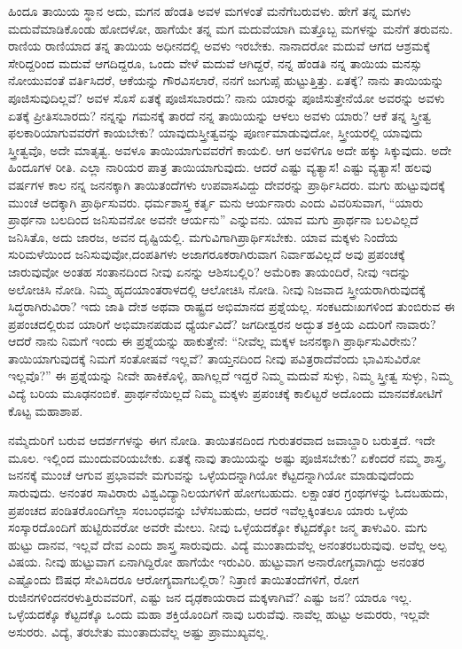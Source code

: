 ಹಿಂದೂ ತಾಯಿಯ ಸ್ಥಾನ ಅದು, ಮಗನ ಹೆಂಡತಿ ಅವಳ ಮಗಳಂತೆ ಮನೆಗೆ\break ಬರುವಳು. ಹೇಗೆ ತನ್ನ ಮಗಳು ಮದುವೆಮಾಡಿಕೊಂಡು ಹೋದಳೋ, ಹಾಗೆಯೇ ತನ್ನ ಮಗ ಮದುವೆಯಾಗಿ ಮತ್ತೊಬ್ಬ ಮಗಳನ್ನು ಮನೆಗೆ ತರುವನು. ರಾಣಿಯ ರಾಣಿಯಾದ ತನ್ನ ತಾಯಿಯ ಅಧೀನದಲ್ಲಿ ಅವಳು ಇರಬೇಕು. ನಾನಾದರೋ ಮದುವೆ ಆಗದ ಆಶ್ರಮಕ್ಕೆ ಸೇರಿದ್ದರಿಂದ ಮದುವೆ ಆಗದಿದ್ದರೂ, ಒಂದು ವೇಳೆ ಮದುವೆ ಆಗಿದ್ದರೆ, ನನ್ನ ಹೆಂಡತಿ ನನ್ನ ತಾಯಿಯ ಮನಸ್ಸು ನೋಯುವಂತೆ ವರ್ತಿಸಿದರೆ, ಆಕೆಯನ್ನು ಗೌರವಿಸಲಾರೆ, ನನಗೆ ಜುಗುಪ್ಸೆ ಹುಟ್ಟುತ್ತಿತ್ತು. ಏತಕ್ಕೆ? ನಾನು ತಾಯಿಯನ್ನು ಪೂಜಿಸುವುದಿಲ್ಲವೆ? ಅವಳ ಸೊಸೆ ಏತಕ್ಕೆ ಪೂಜಿಸಬಾರದು? ನಾನು ಯಾರನ್ನು ಪೂಜಿಸುತ್ತೇನೆಯೋ ಅವರನ್ನು ಅವಳು ಏತಕ್ಕೆ ಪ್ರೀತಿಸಬಾರದು? ನನ್ನನ್ನು ಗಮನಕ್ಕೆ ತಾರದೆ ನನ್ನ ತಾಯಿಯನ್ನು ಆಳಲು ಅವಳು ಯಾರು? ಆಕೆ ತನ್ನ ಸ್ತ್ರೀತ್ವ ಫಲಕಾರಿಯಾಗುವವರೆಗೆ ಕಾಯಬೇಕು? ಯಾವುದು\break ಸ್ತ್ರೀತ್ವವನ್ನು ಪೂರ್ಣಮಾಡುವುದೋ, ಸ್ತ್ರೀಯರಲ್ಲಿ ಯಾವುದು ಸ್ತ್ರೀತ್ವವೊ, ಅದೇ ಮಾತೃತ್ವ. ಅವಳೂ ತಾಯಿಯಾಗುವವರೆಗೆ ಕಾಯಲಿ. ಆಗ ಅವಳಿಗೂ ಅದೇ ಹಕ್ಕು ಸಿಕ್ಕುವುದು. ಅದೇ ಹಿಂದೂಗಳ ರೀತಿ. ಎಲ್ಲಾ ನಾರಿಯರ ಪಾತ್ರ ತಾಯಿಯಾಗುವುದು. ಆದರೆ ಎಷ್ಟು ವ್ಯತ್ಯಾಸ! ಎಷ್ಟು ವ್ಯತ್ಯಾಸ! ಹಲವು ವರ್ಷಗಳ ಕಾಲ ನನ್ನ ಜನನಕ್ಕಾಗಿ ತಾಯಿತಂದೆಗಳು ಉಪವಾಸವಿದ್ದು ದೇವರನ್ನು ಪ್ರಾರ್ಥಿಸಿದರು. ಮಗು ಹುಟ್ಟುವುದಕ್ಕೆ ಮುಂಚೆ ಅದಕ್ಕಾಗಿ ಪ್ರಾರ್ಥಿಸುವರು. ಧರ್ಮಶಾಸ್ತ್ರ ಕರ್ತೃ ಮನು ಆರ್ಯನಾರು ಎಂದು ವಿವರಿಸುವಾಗ, “ಯಾರು ಪ್ರಾರ್ಥನಾ ಬಲದಿಂದ ಜನಿಸುವನೋ ಅವನೇ ಆರ್ಯನು” ಎನ್ನುವನು. ಯಾವ ಮಗು ಪ್ರಾರ್ಥನಾ ಬಲವಿಲ್ಲದೆ ಜನಿಸಿತೊ, ಅದು ಜಾರಜ, ಅವನ ದೃಷ್ಟಿಯಲ್ಲಿ. ಮಗುವಿಗಾಗಿ\break ಪ್ರಾರ್ಥಿಸಬೇಕು. ಯಾವ ಮಕ್ಕಳು ನಿಂದೆಯ ಸುರಿಮಳೆಯಿಂದ ಜನಿಸುವುವೋ,\break ದಂಪತಿಗಳು ಅಜಾಗರೂಕರಾಗಿರುವಾಗ ನಿರ್ವಾಹವಿಲ್ಲದೆ ಅವು ಪ್ರಪಂಚಕ್ಕೆ ಜಾರುವುವೋ ಅಂತಹ ಸಂತಾನದಿಂದ ನೀವು ಏನನ್ನು ಆಶಿಸಬಲ್ಲಿರಿ? ಅಮೆರಿಕಾ ತಾಯಂದಿರೆ, ನೀವು ಇದನ್ನು ಅಲೋಚಿಸಿ ನೋಡಿ. ನಿಮ್ಮ ಹೃದಯಾಂತರಾಳದಲ್ಲಿ ಆಲೋಚಿಸಿ ನೋಡಿ. ನೀವು ನಿಜವಾದ ಸ್ತ್ರೀಯರಾಗಿರುವುದಕ್ಕೆ ಸಿದ್ಧರಾಗಿರುವಿರಾ? ಇದು ಜಾತಿ ದೇಶ ಅಥವಾ ರಾಷ್ಟ್ರದ ಅಭಿಮಾನದ ಪ್ರಶ್ನೆಯಲ್ಲ. ಸಂಕಟದುಃಖಗಳಿಂದ ತುಂಬಿರುವ ಈ ಪ್ರಪಂಚದಲ್ಲಿರುವ ಯಾರಿಗೆ ಅಭಿಮಾನಪಡುವ ಧ್ಯೆರ್ಯವಿದೆ? ಜಗದೀಶ್ವರನ ಅದ್ಭುತ ಶಕ್ತಿಯ ಎದುರಿಗೆ ನಾವಾರು? ಆದರೆ ನಾನು ನಿಮಗೆ ಇಂದು ಈ ಪ್ರಶ್ನೆಯನ್ನು ಹಾಕುತ್ತೇನೆ: “ನೀವೆಲ್ಲ ಮಕ್ಕಳ ಜನನಕ್ಕಾಗಿ ಪ್ರಾರ್ಥಿಸುವಿರೇನು? ತಾಯಿಯಾಗುವುದಕ್ಕೆ ನಿಮಗೆ ಸಂತೋಷವೆ ಇಲ್ಲವೆ? ತಾಯ್ತನದಿಂದ ನೀವು ಪವಿತ್ರರಾದೆವೆಂದು ಭಾವಿಸುವಿರೋ ಇಲ್ಲವೊ?” ಈ ಪ್ರಶ್ನೆಯನ್ನು ನೀವೇ ಹಾಕಿಕೊಳ್ಳಿ, ಹಾಗಿಲ್ಲದೆ ಇದ್ದರೆ ನಿಮ್ಮ ಮದುವೆ ಸುಳ್ಳು, ನಿಮ್ಮ ಸ್ತ್ರೀತ್ವ ಸುಳ್ಳು, ನಿಮ್ಮ ವಿದ್ಯೆ ಬರಿಯ ಮೂಢನಂಬಿಕೆ. ಪ್ರಾರ್ಥನೆಯಿಲ್ಲದೆ ನಿಮ್ಮ ಮಕ್ಕಳು ಪ್ರಪಂಚಕ್ಕೆ ಕಾಲಿಟ್ಟರೆ ಅದೊಂದು ಮಾನವಕೋಟಿಗೆ ಕೊಟ್ಟ ಮಹಾಶಾಪ.

ನಮ್ಮೆದುರಿಗೆ ಬರುವ ಆದರ್ಶಗಳನ್ನು ಈಗ ನೋಡಿ. ತಾಯಿತನದಿಂದ ಗುರುತರವಾದ ಜವಾಬ್ದಾರಿ ಬರುತ್ತದೆ. ಇದೇ ಮೂಲ. ಇಲ್ಲಿಂದ ಮುಂದುವರಿಯಬೇಕು. ಏತಕ್ಕೆ ನಾವು ತಾಯಿಯನ್ನು ಅಷ್ಟು ಪೂಜಿಸಬೇಕು? ಏಕೆಂದರೆ ನಮ್ಮ ಶಾಸ್ತ್ರ, ಜನನಕ್ಕೆ ಮುಂಚೆ ಆಗುವ ಪ್ರಭಾವವೇ ಮಗುವನ್ನು ಒಳ್ಳೆಯದನ್ನಾಗಿಯೋ ಕೆಟ್ಟದನ್ನಾಗಿಯೋ ಮಾಡುವುದೆಂದು ಸಾರುವುದು. ಅನಂತರ ಸಾವಿರಾರು ವಿಶ್ವವಿದ್ಯಾನಿಲಯಗಳಿಗೆ ಹೋಗಬಹುದು. ಲಕ್ಷಾಂತರ ಗ್ರಂಥಗಳನ್ನು ಓದಬಹುದು, ಪ್ರಪಂಚದ ಪಂಡಿತರೊಂದಿಗೆಲ್ಲಾ ಸಂಬಂಧವನ್ನು ಬೆಳೆಸಬಹುದು, ಆದರೆ ಇವೆಲ್ಲಕ್ಕಿಂತಲೂ ಯಾರು ಒಳ್ಳೆಯ ಸಂಸ್ಕಾರದೊಂದಿಗೆ ಹುಟ್ಟಿರುವರೋ ಅವರೇ ಮೇಲು. ನೀವು ಒಳ್ಳೆಯದಕ್ಕೋ ಕೆಟ್ಟದಕ್ಕೋ ಜನ್ಮ ತಾಳುವಿರಿ. ಮಗು ಹುಟ್ಟು ದಾನವ, ಇಲ್ಲವೆ ದೇವ ಎಂದು ಶಾಸ್ತ್ರ ಸಾರುವುದು. ವಿದ್ಯೆ ಮುಂತಾದುವೆಲ್ಲ ಅನಂತರ\break ಬರುವುವು. ಅವೆಲ್ಲ ಅಲ್ಪ ವಿಷಯ. ನೀವು ಹುಟ್ಟುವಾಗ ಏನಾಗಿದ್ದಿರೋ ಹಾಗೆಯೇ ಇರುವಿರಿ. ಹುಟ್ಟುವಾಗ ಅನಾರೋಗ್ಯವಾಗಿದ್ದು ಅನಂತರ ಎಷ್ಟೊಂದು ಔಷಧ ಸೇವಿಸಿದರೂ ಆರೋಗ್ಯವಾಗಬಲ್ಲಿರಾ? ನಿತ್ರಾಣಿ ತಾಯಿತಂದೆಗಳಿಗೆ, ರೋಗ ರುಜಿನಗಳಿಂದ\break ನರಳುತ್ತಿರುವವರಿಗೆ, ಎಷ್ಟು ಜನ ದೃಢಕಾಯರಾದ ಮಕ್ಕಳಾಗಿವೆ? ಎಷ್ಟು ಜನ? ಯಾರೂ ಇಲ್ಲ. ಒಳ್ಳೆಯದಕ್ಕೊ ಕೆಟ್ಟದಕ್ಕೊ ಒಂದು ಮಹಾ ಶಕ್ತಿಯೊಂದಿಗೆ ನಾವು ಬರುವೆವು. ನಾವೆಲ್ಲ ಹುಟ್ಟು ಅಮರರು, ಇಲ್ಲವೇ ಅಸುರರು. ವಿದ್ಯೆ, ತರಬೇತು ಮುಂತಾದುವೆಲ್ಲ ಅಷ್ಟು ಪ್ರಾಮುಖ್ಯವಲ್ಲ.


